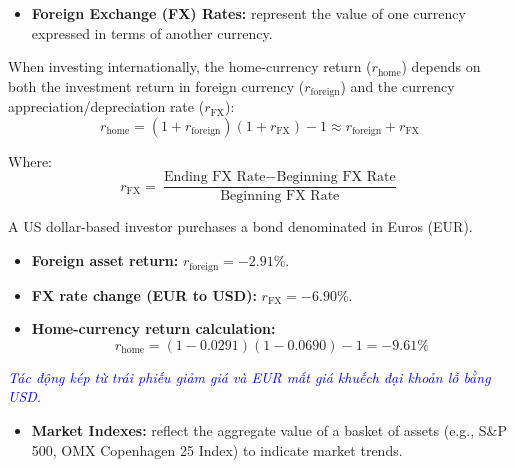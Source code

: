 
\begin{itemize}
	\item \textbf{Foreign Exchange (FX) Rates:} represent the value of one currency expressed in terms of another currency.
\end{itemize}

When investing internationally, the home-currency return ($r_{\text{home}}$) depends on both the investment return in foreign currency ($r_{\text{foreign}}$) and the currency appreciation/depreciation rate ($r_{\text{FX}}$):
\begin{equation}
	r_{\text{home}} = (1 + r_{\text{foreign}})(1 + r_{\text{FX}}) - 1 \approx r_{\text{foreign}} + r_{\text{FX}}
	\label{eq:foreign_exchange_adjust_m2}
\end{equation}

Where:
\begin{equation}
	r_{\text{FX}} = \frac{\text{Ending FX Rate} - \text{Beginning FX Rate}}{\text{Beginning FX Rate}}
	\label{eq:fx_rate_return_m2}
\end{equation}

\begin{tcolorbox}[
	colback=gray!5!white,
	colframe=black!15!white,
	boxrule=0.5pt,
	arc=3pt,
	title=\textbf{Example: Foreign Exchange FX Adjustment on Returns},
	coltitle=black,
	colbacktitle=black!5!white,
	before skip=6pt,
	after skip=6pt,
	breakable
]
A US dollar-based investor purchases a bond denominated in Euros (EUR).
\begin{itemize}
	\item \textbf{Foreign asset return:} $r_{\text{foreign}} = -2.91\%$.
	\item \textbf{FX rate change (EUR to USD):} $r_{\text{FX}} = -6.90\%$.
	\item \textbf{Home-currency return calculation:}
	      \[ r_{\text{home}} = (1 - 0.0291)(1 - 0.0690) - 1 = -9.61\% \]
\end{itemize}

\textcolor{blue}{\textit{Tác động kép từ trái phiếu giảm giá và EUR mất giá khuếch đại khoản lỗ bằng USD.}}
\end{tcolorbox}

\begin{itemize}
	\item \textbf{Market Indexes:} reflect the aggregate value of a basket of assets (e.g., S\&P 500, OMX Copenhagen 25 Index) to indicate market trends.
\end{itemize}

